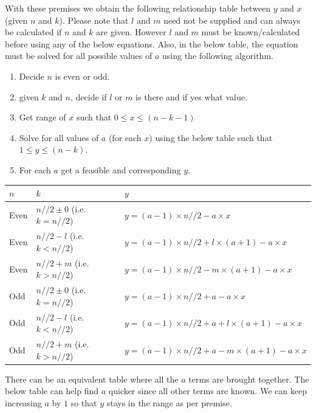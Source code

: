 \documentclass[10pt, twoside]{article}
\begin{document}
With these premises we obtain the following relationship table between $y$ and $x$ (given $n$ and $k$). Please note that $l$ and $m$ need not be supplied and can always be calculated if $n$ and $k$ are given. However $l$ and $m$ must be known/calculated before using any of the below equations. Also, in the below table, the equation must be solved for all possible values of $\textbf{$a$}$ using the following algorithm.
\begin{enumerate}
    \item Decide $n$ is even or odd.
    \item given $k$ and $n$, decide if $l$ or $m$ is there and if yes what value.
    \item Get range of $x$ such that $0 \leq x \leq (n-k-1)$
    \item Solve for all values of $a$ (for each $x$) using the below table such that $1 \leq y \leq (n-k)$.
    \item For each $a$ get a feasible and corresponding $y$.
\end{enumerate}
\begin{tabular}{|l ||l ||l|}
	\hline
	\textbf{$n$} & \textbf{$k$} & \textbf{$y$} \\
	\hline
	Even & $n//2 \pm 0$ \space(i.e. $k = n//2$) & $y = (a-1)\times n//2 - a\times x$ \\
	\hline
	Even & $n//2 - l$ \space(i.e. $k < n//2$) & $y = (a-1)\times n//2 + l \times (a+1) - a\times x$ \\
	\hline
	Even & $n//2 + m$ (i.e. $k > n//2$) & $y = (a-1)\times n//2 - m \times (a+1) - a\times x$ \\
	\hline
	Odd & $n//2 \pm 0$ \space(i.e. $k = n//2$) & $y = (a-1)\times n//2 + a - a\times x$ \\
	\hline
	Odd & $n//2 - l$ \space(i.e. $k < n//2$) & $y = (a-1)\times n//2 + a + l\times(a+1) - a\times x$ \\
	\hline
	Odd & $n//2 + m$ (i.e. $k > n//2$)  & $y = (a-1)\times n//2 + a -m\times(a+1) - a\times x$ \\
	\hline
\end{tabular}


There can be an equivalent table where all the $a$ terms are brought together. The below table can help find $a$ quicker since all other terms are known. We can keep increasing $a$ by $1$ so that $y$ stays in the range as per premise.
\end{document}
